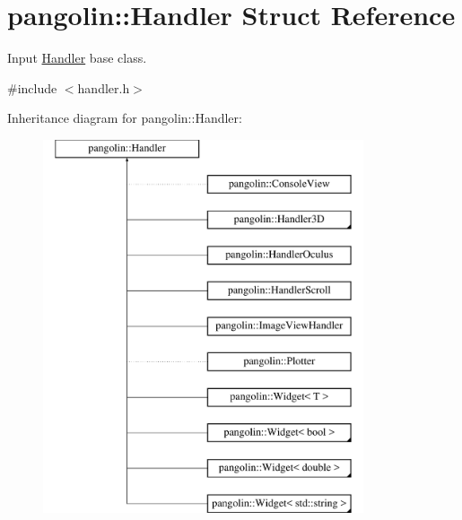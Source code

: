 \hypertarget{structpangolin_1_1_handler}{}\section{pangolin\+:\+:Handler Struct Reference}
\label{structpangolin_1_1_handler}


Input \hyperlink{structpangolin_1_1_handler}{Handler} base class.  




{\ttfamily \#include $<$handler.\+h$>$}

Inheritance diagram for pangolin\+:\+:Handler\+:\begin{figure}[H]
\begin{center}
\leavevmode
\includegraphics[height=11.000000cm]{structpangolin_1_1_handler}
\end{center}
\end{figure}

